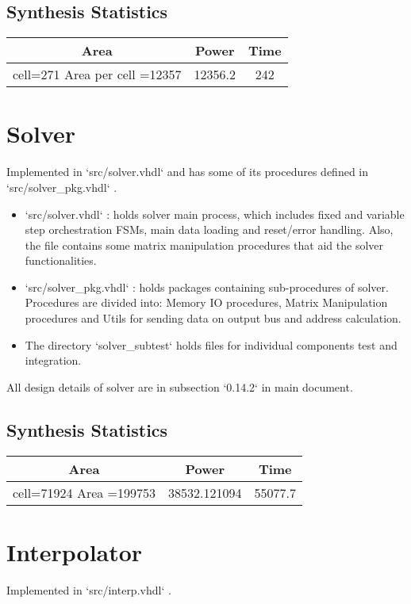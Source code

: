 \documentclass[12pt]{report}
\begin{document}
    \subsection{Synthesis Statistics}
    \begin{tabular}{||c|c|c||}
        \hline
        Area & Power & Time\\\hline\hline
        cell=271 Area per cell =12357 & 12356.2 & 242\\\hline
    \end{tabular}

    \section{Solver}
    Implemented in `src/solver.vhdl` and has some of its procedures defined in `src/solver\_pkg.vhdl` . 

    \begin{itemize}
        \item `src/solver.vhdl` : holds solver main process, which includes fixed and variable step orchestration FSMs, main data loading and reset/error handling. Also, the file contains some matrix manipulation procedures that aid the solver functionalities.
        \item `src/solver\_pkg.vhdl` : holds packages containing sub-procedures of solver. Procedures are divided into: Memory IO procedures, Matrix Manipulation procedures and Utils for sending data on output bus and address calculation.
        \item The directory `solver\_subtest` holds files for individual components test and integration.
    \end{itemize}

    All design details of solver are in subsection `0.14.2` in main document. 
    \subsection{Synthesis Statistics}
    \begin{tabular}{||c|c|c||}
        \hline
        Area & Power & Time\\\hline\hline
        cell=71924 Area =199753 & 38532.121094 & 55077.7\\\hline
    \end{tabular}

    \section{Interpolator}
    Implemented in `src/interp.vhdl` . 
\end{document}
